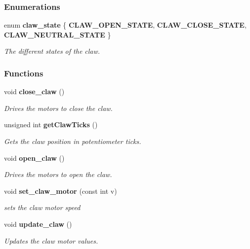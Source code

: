 \subsubsection*{Enumerations}
\begin{DoxyCompactItemize}
\item 
enum \textbf{ claw\+\_\+state} \{ \textbf{ C\+L\+A\+W\+\_\+\+O\+P\+E\+N\+\_\+\+S\+T\+A\+TE}, 
\textbf{ C\+L\+A\+W\+\_\+\+C\+L\+O\+S\+E\+\_\+\+S\+T\+A\+TE}, 
\textbf{ C\+L\+A\+W\+\_\+\+N\+E\+U\+T\+R\+A\+L\+\_\+\+S\+T\+A\+TE}
 \}\begin{DoxyCompactList}\small\item\em The different states of the claw. \end{DoxyCompactList}
\end{DoxyCompactItemize}
\subsubsection*{Functions}
\begin{DoxyCompactItemize}
\item 
void \textbf{ close\+\_\+claw} ()
\begin{DoxyCompactList}\small\item\em Drives the motors to close the claw. \end{DoxyCompactList}\item 
unsigned int \textbf{ get\+Claw\+Ticks} ()
\begin{DoxyCompactList}\small\item\em Gets the claw position in potentiometer ticks. \end{DoxyCompactList}\item 
void \textbf{ open\+\_\+claw} ()
\begin{DoxyCompactList}\small\item\em Drives the motors to open the claw. \end{DoxyCompactList}\item 
void \textbf{ set\+\_\+claw\+\_\+motor} (const int v)
\begin{DoxyCompactList}\small\item\em sets the claw motor speed \end{DoxyCompactList}\item 
void \textbf{ update\+\_\+claw} ()
\begin{DoxyCompactList}\small\item\em Updates the claw motor values. \end{DoxyCompactList}\end{DoxyCompactItemize}


